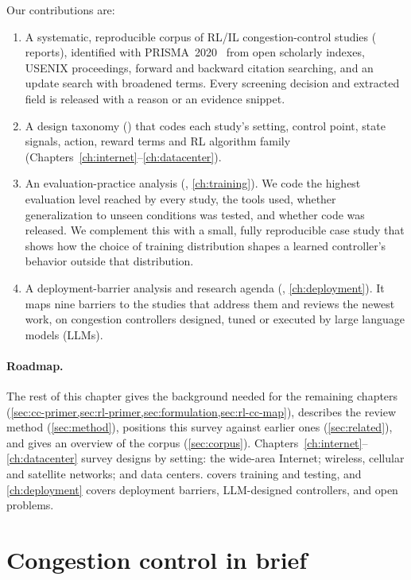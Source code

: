 \noindent Our contributions are:
\begin{enumerate}
  \item A systematic, reproducible corpus of \nStudies{} RL/IL congestion-control studies (\nReportsIncluded{} reports), identified with PRISMA~2020~\cite{page2021prisma} from open scholarly indexes, USENIX proceedings, forward and backward citation searching, and an update search with broadened terms. Every screening decision and extracted field is released with a reason or an evidence snippet.
  \item A design taxonomy () that codes each study's setting, control point, state signals, action, reward terms and RL algorithm family (Chapters~\ref{ch:internet}--\ref{ch:datacenter}).
  \item An evaluation-practice analysis (, \cref{ch:training}). We code the highest evaluation level reached by every study, the tools used, whether generalization to unseen conditions was tested, and whether code was released. We complement this with a small, fully reproducible case study that shows how the choice of training distribution shapes a learned controller's behavior outside that distribution.
  \item A deployment-barrier analysis and research agenda (, \cref{ch:deployment}). It maps nine barriers to the studies that address them and reviews the newest work, on congestion controllers designed, tuned or executed by large language models (LLMs).
\end{enumerate}

\paragraph{Roadmap.} The rest of this chapter gives the background needed for the remaining chapters (\cref{sec:cc-primer,sec:rl-primer,sec:formulation,sec:rl-cc-map}), describes the review method (\cref{sec:method}), positions this survey against earlier ones (\cref{sec:related}), and gives an overview of the corpus (\cref{sec:corpus}). Chapters~\ref{ch:internet}--\ref{ch:datacenter} survey designs by setting: the wide-area Internet; wireless, cellular and satellite networks; and data centers.  covers training and testing, and \cref{ch:deployment} covers deployment barriers, LLM-designed controllers, and open problems.

\section{Congestion control in brief}
\label{sec:cc-primer}

